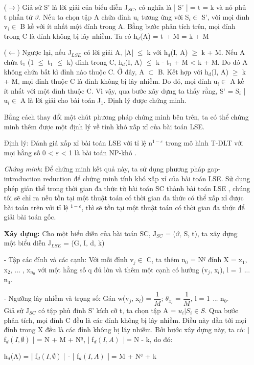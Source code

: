  		($\rightarrow$) Giả sử S' là lời giải của biểu diễn J$_{SC}$, có nghĩa là | S' | = t = k và nó phủ t phần tử $\vartheta$. Nếu ta chọn tập A chứa đỉnh u$_{i}$ tương ứng với S$_{i} \in$ S', với mọi đỉnh v$_{i} \in$ B kề với ít nhất một đỉnh trong A. Bằng bước phân tích trên, mọi đỉnh trong C là đỉnh không bị lây nhiễm. Ta có h$_{d}$(A) = t + M = k + M
 		
 		($\leftarrow$) Ngược lại, nếu J$_{LSE}$ có lời giải A, |A| $\leq$ k với h$_{d}$(I, A) $\geq$ k + M. Nếu A chứa t$_{1}$ (1 $\leq$ t$_{1}$ $\leq$ k) đỉnh trong C, h$_{d}$(I, A) $\leq$ k - t$_{1}$ + M < k + M. Do đó A không chứa bất kì đỉnh nào thuộc C. Ở đây, A $\subset$ B. Kết hợp với h$_{d}$(I, A) $\geq$ k + M, mọi đỉnh thuộc C là đỉnh không bị lây nhiễm. Do đó, mọi đỉnh u$_{i} \in$ A kề ít nhất với một đỉnh thuộc C. Vì vậy, qua bước xây dựng ta thấy rằng, S' = { S$_{i}$ | u$_{i} \in$ A } là lời giải cho bài toán J$_{1}$. Định lý được chứng minh.
 		
 		Bằng cách thay đổi một chút phương pháp chứng minh bên trên, ta có thể chứng minh thêm được một định lý về tính khó xấp xỉ của bài toán LSE.
 		
 		Định lý: Đánh giá xấp xỉ bài toán LSE với tỉ lệ n$^{1 - \varepsilon}$ trong mô hình T-DLT với mọi hằng số 0 < $\varepsilon$ < 1 là bài toán NP-khó .
 		
 		{\itshape Chứng minh}: Để chứng minh kết quả này, ta sử dụng phương pháp gap-introduction reduction \cite{vijay38} để chứng minh tính khó xấp xỉ của bài toán LSE. Sử dụng phép giản thể trong thời gian đa thức từ bài toán SC thành bài toán LSE , chúng tôi sẽ chỉ ra nếu tồn tại một thuật toán có thời gian đa thức có thể xấp xỉ được bài toán trên với tỉ lệ $^{1 - \varepsilon}$, thì sẽ tồn tại một thuật toán có thời gian đa thức để giải bài toán gốc.
 		
 		{\bfseries Xây dựng:} Cho một biểu diễn của bài toán SC, J$_{SC}$ = ($\vartheta$, S, t), ta xây dựng một biểu diễn J$_{LSE}$ = (G, I, d, k) 
 		
 		- Tập các đỉnh và các cạnh: Với mỗi đỉnh v$_{j} \in$ C, ta thêm n$_{0}$ = N$^{q}$ đỉnh X = { x$_{1}$, x$_{2}$, ... , x$_{n_{0}}$} với một hằng số q đủ lớn và thêm một cạnh có hướng (v$_{j}$, x$_{l}$), l = 1 ... n$_{0}$.
 		
 		- Ngưỡng lây nhiễm và trọng số: Gán w(v$_{j}$, x$_{l}$) = $\dfrac{1}{M}$; $\theta_{x_{l}}$ = $\dfrac{1}{M}$, l = 1 ... n$_{0}$.\\
 		
 		Giả sử J$_{SC}$ có tập phủ đinh S' kích cỡ t, ta chọn tập A = ${{u_{i} | S_{i} \in S}}$. Qua bước phân tích, mọi đỉnh C đều là các đỉnh không bị lây nhiễm. Điều này dẫn tới mọi đỉnh trong X đều là các đỉnh không bị lây nhiễm. Bởi bước xây dựng này, ta có: | f$_{d}(I, \emptyset)$ | = N + M + N$^{q}$, | f$_{d}(I, A)$ | = N - k, do đó: 
 		\begin{center}
 			h$_{d}$(A) = | f$_{d}(I, \emptyset)$ | - | f$_{d}(I, A)$ | = M + N$^{q}$ + k
 		\end{center}
 		
 		
 		 
 		
 		



